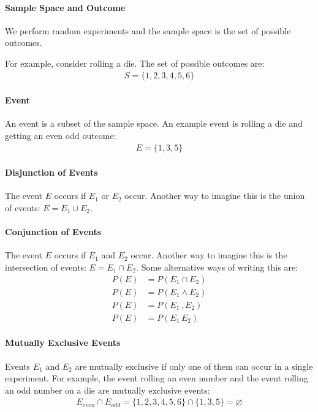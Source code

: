 

\paragraph{Sample Space and Outcome}
We perform random experiments and the sample space is the set of possible
outcomes.

For example, consider rolling a die. The set of possible outcomes are:
\begin{equation*} \begin{split}
	S = \{1,2,3,4,5,6\}
\end{split} \end{equation*}

\paragraph{Event} An event is a subset of the sample space. An example event is
rolling a die and getting an even odd outcome:
\begin{equation*} \begin{split}
	E = \{1,3,5\}
\end{split} \end{equation*}

\paragraph{Disjunction of Events} The event $E$ occurs if $E_1$ or $E_2$ occur.
Another way to imagine this is the union of events: $E = E_1 \cup E_2$.

\paragraph{Conjunction of Events} The event $E$ occurs if $E_1$ and $E_2$ occur.
Another way to imagine this is the intersection of events: $E = E_1 \cap E_2$.
Some alternative ways of writing this are:
\begin{equation*} \begin{split}
	P(E) &= P(E_1 \cap E_2) \\
	P(E) &= P(E_1 \wedge E_2) \\
	P(E) &= P(E_1\, ,  E_2) \\
	P(E) &= P(E_1\,  E_2) 
\end{split} \end{equation*}

\paragraph{Mutually Exclusive Events} Events $E_1$ and $E_2$ are mutually
exclusive if only one of them can occur in a single experiment. For example, the
event rolling an even number and the event rolling an odd number on a die are
mutually exclusive events:
\begin{equation*} \begin{split}
E_{even} \cap E_{odd} =  \{1,2,3,4,5,6\} \cap \{1,3,5\} = \varnothing
\end{split} \end{equation*}

